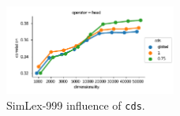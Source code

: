 \begin{figure}[h]
  \centering

  \includegraphics[width=0.5\textwidth]{supplement/figures/SimLex999-interaction-cds}

  \caption{SimLex-999 influence of \texttt{cds}.}
  \label{fig:SimLex999-cds}
\end{figure}
